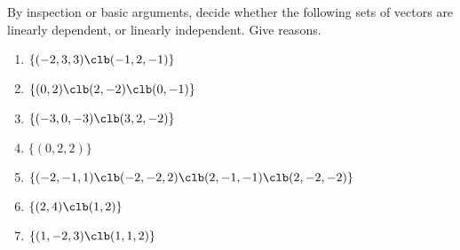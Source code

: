 






\sectionExercises



\begin{exercise}  
By inspection or basic arguments, decide whether the following sets of vectors are linearly dependent, or linearly independent.  Give reasons.

\begin{enumerate}
\item \(\{(-2,3,3)\clb (-1,2,-1)\}\)

\item \(\{(0,2)\clb (2,-2)\clb (0,-1)\}\)

\item \(\{(-3,0,-3)\clb (3,2,-2)\}\)

\item \(\{(0,2,2)\}\)


\item \(\{(-2,-1,1)\clb (-2,-2,2)\clb (2,-1,-1)\clb (2,-2,-2)\}\)

\item \(\{(2,4)\clb (1,2)\}\)

\item \(\{( 1,-2,3)\clb (1,1,2)\}\)

\end{enumerate}
\end{exercise}







